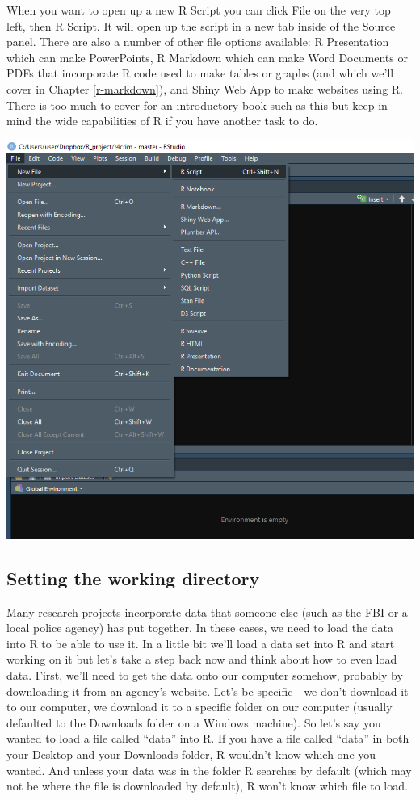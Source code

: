 \documentclass[
]{krantz}
\begin{document}
When you want to open up a new R Script you can click File on the very top left, then R Script. It will open up the script in a new tab inside of the Source panel. There are also a number of other file options available: R Presentation which can make PowerPoints, R Markdown which can make Word Documents or PDFs that incorporate R code used to make tables or graphs (and which we'll cover in Chapter \ref{r-markdown}), and Shiny Web App to make websites using R. There is too much to cover for an introductory book such as this but keep in mind the wide capabilities of R if you have another task to do.

\includegraphics{images/rstudio_2.PNG}

\hypertarget{setting-the-working-directory}{%
\subsection{Setting the working directory}\label{setting-the-working-directory}}

Many research projects incorporate data that someone else (such as the FBI or a local police agency) has put together. In these cases, we need to load the data into R to be able to use it. In a little bit we'll load a data set into R and start working on it but let's take a step back now and think about how to even load data. First, we'll need to get the data onto our computer somehow, probably by downloading it from an agency's website. Let's be specific - we don't download it to our computer, we download it to a specific folder on our computer (usually defaulted to the Downloads folder on a Windows machine). So let's say you wanted to load a file called ``data'' into R. If you have a file called ``data'' in both your Desktop and your Downloads folder, R wouldn't know which one you wanted. And unless your data was in the folder R searches by default (which may not be where the file is downloaded by default), R won't know which file to load.
\end{document}
